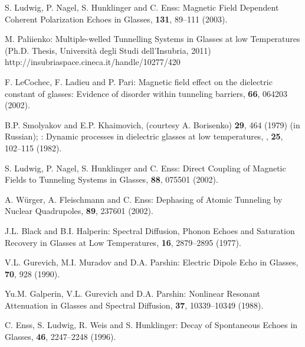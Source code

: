 \documentclass[10pt]{article}
\begin{document}
\begin{thebibliography}{99}
 S. Ludwig, P. Nagel, S. Hunklinger and C. Enss:
\newblock Magnetic Field Dependent Coherent Polarization Echoes in Glasses,
 {\bf 131}, 89--111 (2003).

 M. Paliienko:
\newblock Multiple-welled Tunnelling Systems in Glasses at low
Temperatures
\newblock (Ph.D. Thesis, Universit\`a degli Studi dell'Insubria, 2011)
http://insubriaspace.cineca.it/handle/10277/420

 F. LeCochec, F. Ladieu and P. Pari:
\newblock Magnetic field effect on the dielectric constant of glasses: 
Evidence of disorder within tunneling barriers,
 {\bf 66}, 064203 (2002).

 B.P. Smolyakov and E.P. Khaimovich, 
(courtesy A. Borisenko)
 {\bf 29}, 464 (1979) (in Russian);
: 
\newblock Dynamic processes in dielectric glasses at low temperatures,
, {\bf 25}, 102–115 (1982).  


 S. Ludwig, P. Nagel, S. Hunklinger and C. Enss:
\newblock Direct Coupling of Magnetic Fields to Tunneling Systems in Glasses,
 {\bf 88}, 075501 (2002). 

 A. W\"urger, A. Fleischmann and C. Enss:
\newblock Dephasing of Atomic Tunneling by Nuclear Quadrupoles,
 {\bf 89}, 237601 (2002).

 J.L. Black and B.I. Halperin:
\newblock Spectral Diffusion, Phonon Echoes and Saturation Recovery in Glasses at Low Temperatures,
 {\bf 16}, 2879--2895 (1977).

 V.L. Gurevich, M.I. Muradov and D.A. Parshin:
\newblock Electric Dipole Echo in Glasses,
 {\bf 70}, 928 (1990).

 Yu.M. Galperin, V.L. Gurevich and D.A. Parshin:
\newblock Nonlinear Resonant Attenuation in Glasses and Spectral Diffusion,
 {\bf 37}, 10339--10349 (1988). 

 C. Enss, S.  Ludwig, R. Weis and S. Hunklinger:
\newblock Decay of Spontaneous Echoes in Glasses,
 {\bf 46}, 2247--2248 (1996). 



\end{thebibliography}
\end{document}
